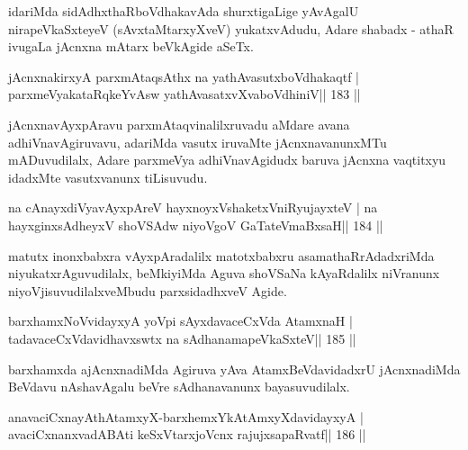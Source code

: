 \begin{artha}
idariMda sidAdhxthaRboVdhakavAda shurxtigaLige yAvAgalU nirapeVkaSxteyeV (sAvxtaMtarxyXveV) yukatxvAdudu, Adare shabadx - athaR ivugaLa jAcnxna mAtarx beVkAgide aSeTx.
\end{artha}

\begin{shl}
jAcnxnakirxyA parxmAtaqsAthx na yathAvasutxboVdhakaqtf |
parxmeVyakataRqkeYvAsw yathAvasatxvXvaboVdhiniV\hfill || 183 ||
\end{shl}

\begin{artha}
jAcnxnavAyxpAravu parxmAtaqvinalilxruvadu aMdare avana adhiVnavAgiruvavu, adariMda vasutx iruvaMte jAcnxnavanunxMTu mADuvudilalx, Adare parxmeVya adhiVnavAgidudx baruva jAcnxna vaqtitxyu idadxMte vasutxvanunx tiLisuvudu.
\end{artha}


\begin{shl}
na cAnayxdiVyavAyxpAreV hayxnoyxV\s shaketxVniRyujayxteV |
na hayxginxsAdheyxV shoVSAdw niyoVgoV GaTateV\s maBxsaH\hfill || 184 ||
\end{shl}

\begin{artha}
matutx inonxbabxra vAyxpAradalilx matotxbabxru asamathaRrAdadxriMda niyukatxrAguvudilalx, beMkiyiMda Aguva shoVSaNa kAyaRdalilx niVranunx niyoVjisuvudilalxveMbudu parxsidadhxveV Agide.
\end{artha}


\begin{shl}
barxhamxNoV\s vidayxyA yoV\s pi sAyxdavaceCxVda AtamxnaH |
tadavaceCxVdavidhavxswtx na sAdhanamapeVkaSxteV\hfill || 185 ||
\end{shl}

\begin{artha}
barxhamxda ajAcnxnadiMda Agiruva yAva AtamxBeVdavidadxrU jAcnxnadiMda BeVdavu nAshavAgalu beVre sAdhanavanunx bayasuvudilalx.
\end{artha}


\begin{shl}
anavaciCxnayAthAtamxyX-barxhemxYkAtAmxyXdavidayxyA |
avaciCxnanxvadABAti keSxVtarxjoVcnx rajujxsapaRvatf\hfill || 186 ||
\end{shl}

